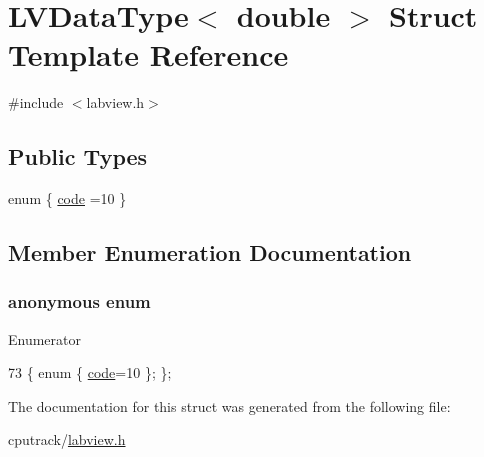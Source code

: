 \hypertarget{struct_l_v_data_type_3_01double_01_4}{}\section{L\+V\+Data\+Type$<$ double $>$ Struct Template Reference}
\label{struct_l_v_data_type_3_01double_01_4}


{\ttfamily \#include $<$labview.\+h$>$}

\subsection*{Public Types}
\begin{DoxyCompactItemize}
\item 
enum \{ \hyperlink{struct_l_v_data_type_3_01double_01_4_ad73d1660fdf534b0e53b9ce82b64f7b2a973e600a0bbf9147a0b80eae974fe57e}{code} =10
 \}
\end{DoxyCompactItemize}


\subsection{Member Enumeration Documentation}
\subsubsection[{\texorpdfstring{anonymous enum}{anonymous enum}}]{\setlength{\rightskip}{0pt plus 5cm}anonymous enum}\hypertarget{struct_l_v_data_type_3_01double_01_4_ad73d1660fdf534b0e53b9ce82b64f7b2}{}\label{struct_l_v_data_type_3_01double_01_4_ad73d1660fdf534b0e53b9ce82b64f7b2}
\begin{Desc}
\item[Enumerator]\par
\begin{description}
\item[{\em 
code\hypertarget{struct_l_v_data_type_3_01double_01_4_ad73d1660fdf534b0e53b9ce82b64f7b2a973e600a0bbf9147a0b80eae974fe57e}{}\label{struct_l_v_data_type_3_01double_01_4_ad73d1660fdf534b0e53b9ce82b64f7b2a973e600a0bbf9147a0b80eae974fe57e}
}]\end{description}
\end{Desc}

\begin{DoxyCode}
73 \{ \textcolor{keyword}{enum} \{ \hyperlink{struct_l_v_data_type_3_01double_01_4_ad73d1660fdf534b0e53b9ce82b64f7b2a973e600a0bbf9147a0b80eae974fe57e}{code}=10 \}; \};
\end{DoxyCode}


The documentation for this struct was generated from the following file\+:\begin{DoxyCompactItemize}
\item 
cputrack/\hyperlink{labview_8h}{labview.\+h}\end{DoxyCompactItemize}
